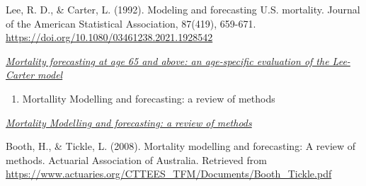 \documentclass[
]{article}
\providecommand{\tightlist}{%
  \setlength{\itemsep}{0pt}\setlength{\parskip}{0pt}}
\begin{document}
Lee, R. D., \& Carter, L. (1992). Modeling and forecasting U.S.
mortality. Journal of the American Statistical Association, 87(419),
659-671. \url{https://doi.org/10.1080/03461238.2021.1928542}

\href{https://www.tandfonline.com/doi/full/10.1080/03461238.2021.1928542\#d1e148}{\emph{Mortality
forecasting at age 65 and above: an age-specific evaluation of the
Lee-Carter model}}

\begin{enumerate}
\def\labelenumi{\arabic{enumi}.}
\setcounter{enumi}{4}
\tightlist
\item
  Mortallity Modelling and forecasting: a review of methods
\end{enumerate}

\href{https://www.actuaries.org/CTTEES_TFM/Documents/Booth_Tickle.pdf}{\emph{Mortality
Modelling and forecasting: a review of methods}}

Booth, H., \& Tickle, L. (2008). Mortality modelling and forecasting: A
review of methods. Actuarial Association of Australia. Retrieved from
\url{https://www.actuaries.org/CTTEES_TFM/Documents/Booth_Tickle.pdf}
\end{document}
